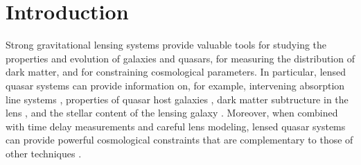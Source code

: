 \documentclass[twocolumn]{aastex6}
\begin{document}



\section{Introduction} \label{sec:intro}

Strong gravitational lensing systems provide valuable tools for 
studying the properties and evolution of galaxies and quasars, for
measuring the distribution of dark matter, and for constraining
cosmological parameters.
In particular, lensed quasar systems can provide information on, for example,
intervening absorption line systems \citep[e.g.,][]{smette95}, 
properties of quasar host galaxies \citep[e.g.,][]{peng06}, 
dark matter subtructure in the lens \citep[e.g.,][]{dk02},
and the stellar content of the lensing galaxy \citep[e.g.,][]{schechter14}.
Moreover, when combined with time delay measurements and careful lens modeling,
lensed quasar systems can provide powerful cosmological constraints
that are complementary to those of other techniques \citep[e.g.,][]{bonvin17,suyu16,tm16}.
\end{document}
